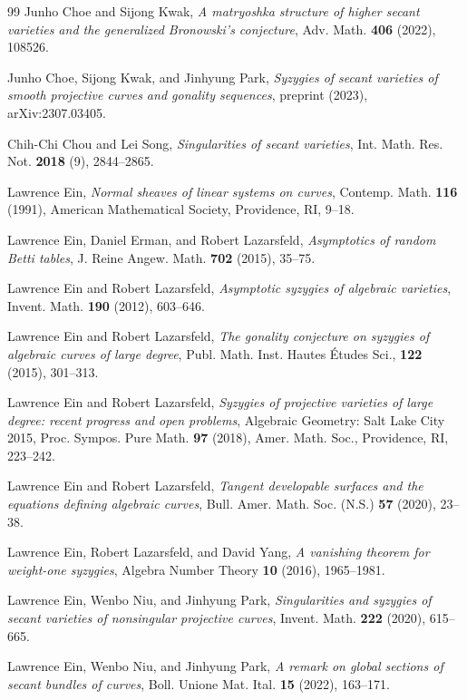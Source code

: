 \documentclass[graybox]{svmult}
\begin{document}
\begin{thebibliography}{99}
Junho Choe and Sijong Kwak, \textit{A matryoshka structure of higher secant varieties and the generalized Bronowski's conjecture}, Adv. Math. \textbf{406} (2022), 108526.

Junho Choe, Sijong Kwak, and Jinhyung Park, \textit{Syzygies of secant varieties of smooth projective curves and gonality sequences},  preprint (2023), arXiv:2307.03405.

Chih-Chi Chou and Lei Song, \textit{Singularities of secant varieties}, Int. Math. Res. Not. \textbf{2018} (9), 2844--2865.

Lawrence Ein, \textit{Normal sheaves of linear systems on curves}, Contemp. Math. \textbf{116} (1991), American Mathematical Society, Providence, RI, 9--18.

Lawrence Ein, Daniel Erman, and Robert Lazarsfeld, \textit{Asymptotics of random Betti tables}, J. Reine Angew. Math. \textbf{702} (2015), 35--75.
	
Lawrence Ein and Robert Lazarsfeld, \textit{Asymptotic syzygies of algebraic varieties}, Invent. Math. \textbf{190} (2012), 603--646.	
	
Lawrence Ein and Robert Lazarsfeld, \textit{The gonality conjecture on syzygies of algebraic curves of large degree}, Publ. Math. Inst. Hautes \'Etudes Sci., \textbf{122} (2015), 301--313.

Lawrence Ein and Robert Lazarsfeld, \textit{Syzygies of projective varieties of large degree: recent progress and open problems}, Algebraic Geometry: Salt Lake City 2015, Proc. Sympos. Pure Math. \textbf{97} (2018), Amer. Math. Soc., Providence, RI, 223--242.

Lawrence Ein and Robert Lazarsfeld, \textit{Tangent developable surfaces and the equations defining algebraic curves}, Bull. Amer. Math. Soc. (N.S.) \textbf{57} (2020), 23--38.

Lawrence Ein, Robert Lazarsfeld, and David Yang, \textit{A vanishing theorem for weight-one syzygies}, Algebra Number Theory \textbf{10} (2016), 1965--1981.

Lawrence Ein, Wenbo Niu, and Jinhyung Park, \textit{Singularities and syzygies of secant varieties of nonsingular projective curves}, Invent. Math. \textbf{222} (2020), 615--665.

Lawrence Ein, Wenbo Niu, and Jinhyung Park, \textit{A remark on global sections of secant bundles of curves}, Boll. Unione Mat. Ital. \textbf{15} (2022), 163--171.


\end{thebibliography}
\end{document}
